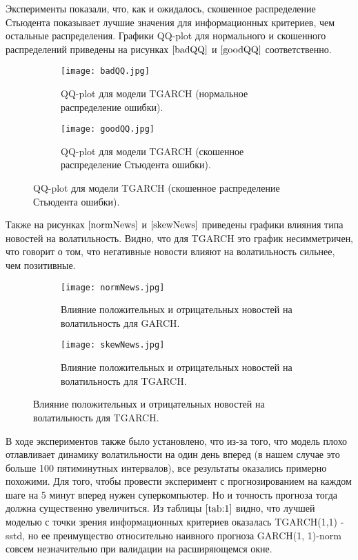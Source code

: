 \documentclass[]{article}
\begin{document}
Эксперименты показали, что, как и ожидалось, скошенное распределение Стьюдента показывает лучшие значения для информационных критериев, чем остальные распределения. Графики QQ-plot для нормального и скошенного распределений приведены на рисунках $\ref{badQQ}$ и $\ref{goodQQ}$ соответственно.


\begin{figure}[h!]
	\centering
	\begin{subfigure}{0.49\textwidth}
		\texttt{[image: badQQ.jpg]}
		\caption{QQ-plot для модели TGARCH (нормальное распределение ошибки).}
		\label{badQQ}
	\end{subfigure}
	\hfill
	\begin{subfigure}{0.49\textwidth}
		\texttt{[image: goodQQ.jpg]}
		\caption{QQ-plot для модели TGARCH (скошенное распределение Стьюдента ошибки).}
		\label{goodQQ}
	\end{subfigure}
\end{figure}




Также на рисунках $\ref{normNews}$ и $\ref{skewNews}$ приведены графики влияния типа новостей на волатильность. Видно, что для TGARCH это график несимметричен, что говорит о том, что негативные новости влияют на волатильность сильнее, чем позитивные.

\begin{figure}[h!]
	\centering
	\begin{subfigure}{0.49\textwidth}
		\texttt{[image: normNews.jpg]}
		\caption{Влияние положительных и отрицательных новостей на волатильность для GARCH.}
		\label{normNews}
	\end{subfigure}
	\hfill
	\begin{subfigure}{0.49\textwidth}
		\texttt{[image: skewNews.jpg]}
		\caption{Влияние положительных и отрицательных новостей на волатильность для TGARCH.}
		\label{skewNews}
	\end{subfigure}
	\label{fig:both_images}
\end{figure}

В ходе экспериментов также было установлено, что из-за того, что модель плохо отлавливает динамику волатильности на один день вперед (в нашем случае это больше 100 пятиминутных интервалов), все результаты оказались примерно похожими. Для того, чтобы провести эксперимент с прогнозированием на каждом шаге на 5 минут вперед нужен суперкомпьютер. Но и точность прогноза тогда должна существенно увеличиться. Из таблицы $\ref{tab:1}$ видно, что лучшей моделью с точки зрения информационных критериев оказалась TGARCH(1,1) -sstd, но ее преимущество относительно наивного прогноза GARCH(1, 1)-norm совсем незначительно при валидации на расширяющемся окне.
\end{document}
